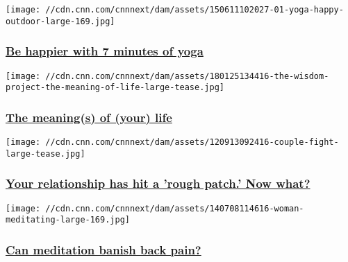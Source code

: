 \href{/2015/06/12/health/yoga-happiness/index.html}{}

\texttt{[image: //cdn.cnn.com/cnnnext/dam/assets/150611102027-01-yoga-happy-outdoor-large-169.jpg]}

\hypertarget{be-happier-with-7-minutes-of-yoga}{%
\subsubsection{\texorpdfstring{\href{/2015/06/12/health/yoga-happiness/index.html}{Be
happier with 7 minutes of
yoga}}{Be happier with 7 minutes of yoga}}\label{be-happier-with-7-minutes-of-yoga}}

\href{/2018/01/31/health/meaning-of-life-wisdom-project/index.html}{}

\texttt{[image: //cdn.cnn.com/cnnnext/dam/assets/180125134416-the-wisdom-project-the-meaning-of-life-large-tease.jpg]}

\hypertarget{the-meanings-of-your-life}{%
\subsubsection{\texorpdfstring{\href{/2018/01/31/health/meaning-of-life-wisdom-project/index.html}{The
meaning(s) of (your)
life}}{The meaning(s) of (your) life}}\label{the-meanings-of-your-life}}

\href{/2018/02/06/health/rough-patch-relationship-kerner/index.html}{}

\texttt{[image: //cdn.cnn.com/cnnnext/dam/assets/120913092416-couple-fight-large-tease.jpg]}

\hypertarget{your-relationship-has-hit-a-rough-patch-now-what-}{%
\subsubsection{\texorpdfstring{\href{/2018/02/06/health/rough-patch-relationship-kerner/index.html}{Your
relationship has hit a 'rough patch.' Now what?
}}{Your relationship has hit a 'rough patch.' Now what? }}\label{your-relationship-has-hit-a-rough-patch-now-what-}}

\href{/2016/03/24/health/back-pain-relief-meditation-mindfulness/index.html}{}

\texttt{[image: //cdn.cnn.com/cnnnext/dam/assets/140708114616-woman-meditating-large-169.jpg]}

\hypertarget{can-meditation-banish-back-pain}{%
\subsubsection{\texorpdfstring{\href{/2016/03/24/health/back-pain-relief-meditation-mindfulness/index.html}{Can
meditation banish back
pain?}}{Can meditation banish back pain?}}\label{can-meditation-banish-back-pain}}

